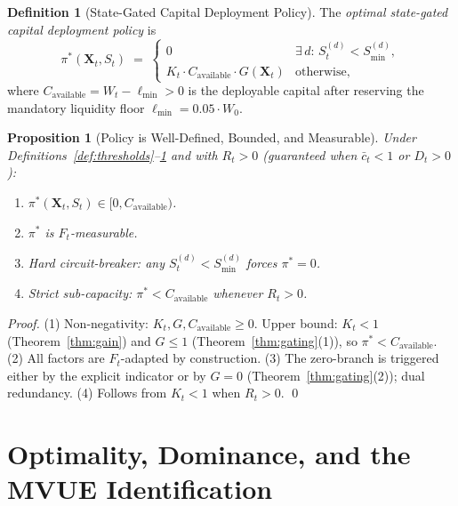 \documentclass[12pt,openany]{book}
\newcommand{\calF}{\mathcal{F}}
\numberwithin{equation}{chapter}
\theoremstyle{plain}
\newtheorem{proposition}[theorem]{Proposition}
\theoremstyle{definition}
\newtheorem{definition}[theorem]{Definition}
\theoremstyle{remark}
\def\mathcal#1{#1}%
\begin{document}
\begin{definition}[State-Gated Capital Deployment Policy]
\label{def:policy}
The \emph{optimal state-gated capital deployment policy} is
\begin{equation}
  \pi^*(\mathbf{X}_t, S_t) \;=\;
  \begin{cases}
    0
      & \exists\,d:\,\mathcal{S}_t^{(d)} <
        \mathcal{S}_{\min}^{(d)}, \\[4pt]
    K_t \cdot C_{\mathrm{available}} \cdot G(\mathbf{X}_t)
      & \text{otherwise,}
  \end{cases}
  \label{eq:policy}
\end{equation}
where $C_{\mathrm{available}} = W_t - \ell_{\min} > 0$ is the
deployable capital after reserving the mandatory liquidity floor
$\ell_{\min} = 0.05 \cdot W_0$.
\end{definition}

\begin{proposition}[Policy is Well-Defined, Bounded, and
Measurable]
\label{prop:policy}
Under Definitions~\ref{def:thresholds}--\ref{def:policy} and
with $R_t > 0$ (guaranteed when $\bar{c}_t < 1$ or $D_t > 0$):
\begin{enumerate}[label=\textup{(\arabic*)}]
  \item $\pi^*(\mathbf{X}_t, S_t) \in [0, C_{\mathrm{available}})$.
  \item $\pi^*$ is $\calF_t$-measurable.
  \item Hard circuit-breaker: any $\mathcal{S}_t^{(d)} <
        \mathcal{S}_{\min}^{(d)}$ forces $\pi^* = 0$.
  \item Strict sub-capacity: $\pi^* < C_{\mathrm{available}}$
        whenever $R_t > 0$.
\end{enumerate}
\end{proposition}

\begin{proof}
(1) Non-negativity: $K_t, G, C_{\mathrm{available}} \geq 0$.
Upper bound: $K_t < 1$ (Theorem~\ref{thm:gain}) and $G \leq 1$
(Theorem~\ref{thm:gating}(1)), so $\pi^* < C_{\mathrm{available}}$.
(2) All factors are $\calF_t$-adapted by construction.
(3) The zero-branch is triggered either by the explicit indicator
or by $G = 0$ (Theorem~\ref{thm:gating}(2)); dual redundancy.
(4) Follows from $K_t < 1$ when $R_t > 0$.
\qed
\end{proof}

\chapter{Optimality, Dominance, and the MVUE Identification}
\label{ch:optimality}
\end{document}
